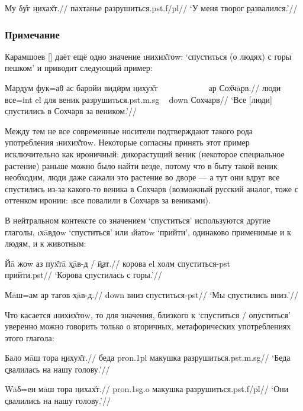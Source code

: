 \begingl
\gla Му δу̊ғ \b{нихах̌т}.//
 пахтанье разрушиться.{\sc pst.f/pl}//
\glft ‘У меня творог \b{развалился}.’//
\endgl \xe

\subsubsection*{Примечание}

Карамшоев [\cite*[314]{karamshoev1991}] даёт ещё одно значение \i{нихих̌тоw}: ‘спуститься (о людях) с горы пешком’ и приводит следующий пример:

\begingl
\gla Мардум фук=аθ ас баройи видӣрм \b{нихух̌т} ~~~~~~~~~~~ ар Сох̌чāрв.//
\glc люди все={\sc int} {\sc el} для веник разрушиться.{\sc pst.m.sg} ~ {\sc down} Сохчарв//
\glft ‘Все [люди] \b{спустились} в Сохчарв за веником.’//
\endgl \xe

Между тем не все современные носители подтверждают такого рода употребления \i{нихих̌тоw}. Некоторые согласны принять этот пример исключительно как ироничный: дикорастущий веник (некоторое специальное растение) раньше можно было найти везде, потому что в быту такой веник необходим, люди даже сажали это растение во дворе — а тут они вдруг все спустились из-за какого-то веника в Сохчарв (возможный русский аналог, тоже с оттенком иронии: \i{все повалили в Сохчарв за вениками}).

В нейтральном контексте со значением ‘спуститься’ используются другие глаголы, \i{хāвдоw} ‘спуститься’ или \i{йатоw} ‘прийти’, одинаково применимые и к людям, и к животным:

\begingl
\gla Йā жоw аз пух̌тā \b{хāв-д} / \b{йат}.//
 корова {\sc el} холм спуститься-{\sc pst} ~~~~~~ прийти.{\sc pst}//
\glft ‘Корова \b{спустилась} с горы.’//
\endgl \xe

\begingl
\gla Мāш=ам ар тагов \b{хāв-д}.//
 {\sc down} вниз спуститься-{\sc pst}//
\glft ‘Мы \b{спустились} вниз.’//
\endgl \xe

Что касается \i{нихих̌тоw}, то для значения, близкого к ‘спуститься / опуститься’ уверенно можно говорить только о вторичных, метафорических употреблениях этого глагола:

\begingl
\gla Бало мāш тора \b{нихух̌т}.//
\glc беда {\sc pron.1pl} макушка разрушиться.{\sc pst.m.sg}//
\glft ‘Беда \b{свалилась} на нашу голову.’//
\endgl \xe

\begingl
\gla Wāδ=ен мāш тора \b{нихах̌т}.//
 {\sc pron.1sg.o} макушка разрушиться.{\sc pst.f/pl}//
\glft ‘Они \b{свалились} на нашу голову.’//
\endgl \xe

